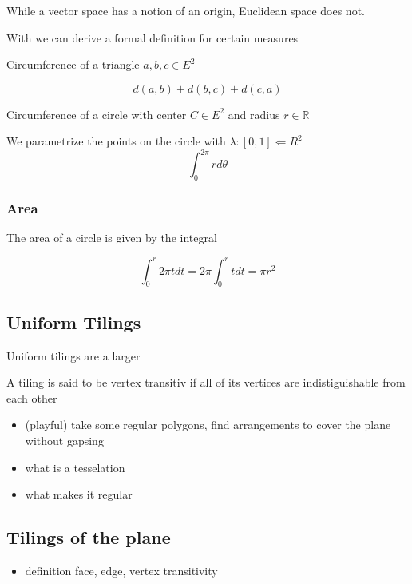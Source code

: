 While a vector space has a notion of an origin, Euclidean space does not.

With we can derive a formal definition for certain measures

Circumference of a triangle $a, b, c \in E^2$

\[
d(a, b) + d(b, c) + d(c, a)
\]


Circumference of a circle with center $C \in E^2$ and radius $r \in \mathbb{R}$

We parametrize the points on the circle with $\lambda: [0, 1] \Leftarrow R^2$
\[
\int_0^{2\pi} r d\theta
\]



\subsubsection{Area}

The area of a circle is given by the integral

\[
\int_0^r 2 \pi t dt = 2\pi \int_0^r t dt = \pi r^2
\]

\subsection{Uniform Tilings}\label{uniform-tilings}

Uniform tilings are a larger

\begin{definition}

A tiling is said to be vertex transitiv if all of its vertices are
indistiguishable from each other

\end{definition}

\begin{itemize}
\tightlist
\item[$\square$]
  (playful) take some regular polygons, find arrangements to cover the
  plane without gapsing
\item[$\square$]
  what is a tesselation
\item[$\square$]
  what makes it regular
\end{itemize}

\subsection{Tilings of the plane}\label{tilings-of-the-plane}

\begin{itemize}
\tightlist
\item[$\square$]
  definition face, edge, vertex transitivity
\end{itemize}

